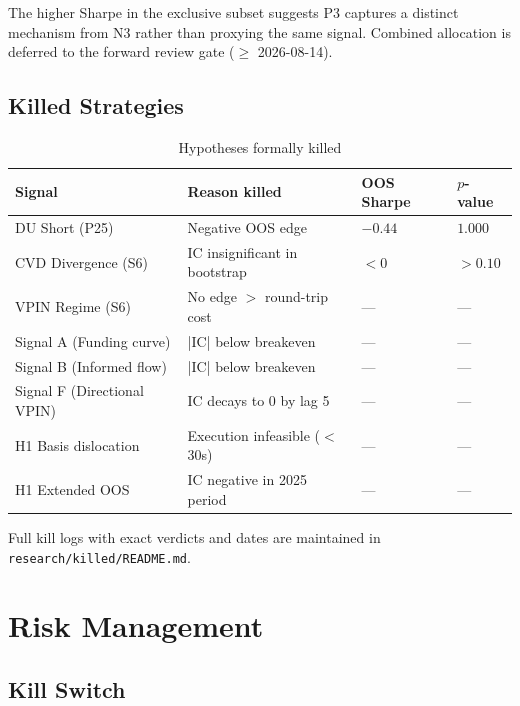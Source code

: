 \documentclass[12pt, a4paper]{article}
\theoremstyle{definition}
\begin{document}
The higher Sharpe in the exclusive subset suggests P3 captures a distinct
mechanism from N3 rather than proxying the same signal. Combined
allocation is deferred to the forward review gate ($\geq$ 2026-08-14).

\subsection{Killed Strategies}

\begin{table}[H]
\centering
\caption{Hypotheses formally killed}
\begin{tabular}{llll}
\toprule
\textbf{Signal} & \textbf{Reason killed} & \textbf{OOS Sharpe} & \textbf{$p$-value} \\
\midrule
DU Short (P25)         & Negative OOS edge            & $-0.44$ & $1.000$ \\
CVD Divergence (S6)    & IC insignificant in bootstrap & $< 0$   & $> 0.10$ \\
VPIN Regime (S6)       & No edge $>$ round-trip cost  & —       & —       \\
Signal A (Funding curve) & |IC| below breakeven        & —       & —       \\
Signal B (Informed flow) & |IC| below breakeven        & —       & —       \\
Signal F (Directional VPIN) & IC decays to 0 by lag 5 & —       & —       \\
H1 Basis dislocation   & Execution infeasible ($<$30s) & —      & —       \\
H1 Extended OOS        & IC negative in 2025 period   & —       & —       \\
\bottomrule
\end{tabular}
\end{table}

Full kill logs with exact verdicts and dates are maintained in
\texttt{research/killed/README.md}.

\section{Risk Management}

\subsection{Kill Switch}
\end{document}
